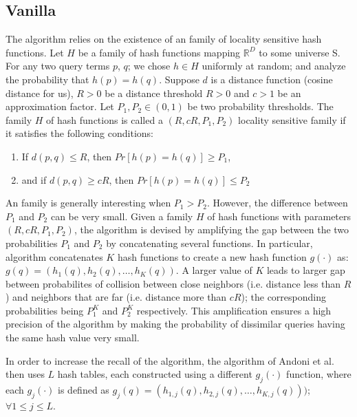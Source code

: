 \subsection{Vanilla \lsh}
\label{sec:vlsh}
The \lsh algorithm relies on the existence of an family of locality sensitive hash functions. 
Let $H$ be a family of hash functions mapping 
 $\mathbb{R}^D$ to some universe S. For any two query terms $p$, $q$; we chose $h\in H$ uniformly at random; 
 and analyze the probability that $h(p) = h(q)$.  
 Suppose $d$ is a distance function (cosine distance for us), 
$R > 0$ be a distance threshold $R>0$ and $c>1$ be an approximation factor.   
Let $P_1, P_2 \in (0, 1)$ be two probability thresholds.  
The family $H$ of hash functions is called a $(R, cR, P_1, P_2)$ locality sensitive family if 
 it satisfies the following conditions:
\begin{enumerate}
\item If $d(p,q) \leq R$, then $Pr[h(p)=h(q)] \geq P_1$, 
\item and if $d(p,q) \geq cR$, then $Pr[h(p)=h(q)] \leq P_2$
\end{enumerate}
An \lsh family is generally interesting when  $P_1>P_2$. 
However, the difference between $P_1$ and $P_2$ can be very small. 
Given a family $H$ of hash functions with parameters $(R, cR, P_1,P_2)$, 
the \lsh algorithm is devised by amplifying the gap between 
the two probabilities $P_1$ and $P_2$ by concatenating several functions. 
In particular, \lsh algorithm concatenates $K$ hash functions
to create a new hash function $g(\cdot)$ as:
$g(q)=(h_1(q),h_2(q),\dots,h_K(q))$. 
A larger value of $K$ leads to larger 
gap between probabilites of collision between close neighbors (i.e. distance less than $R$) and neighbors that are far (i.e. 
distance more than $cR$); 
the corresponding probabilities being $P_1^{K}$ and $P_2^{K}$ respectively. 
This amplification ensures a high precision of the algorithm by  
making the probability of dissimilar queries having the same hash value very small.

In order to increase the recall of the \lsh algorithm, the algorithm of Andoni et al. then uses
$L$ hash tables, each constructed using a different $g_j(\cdot)$ function, where each 
$g_j(\cdot)$ is defined as $g_j(q)=(h_{1,j}(q),h_{2,j}(q),\dots,h_{K,j}(q)))$; $\forall 1 \leq j \leq  L$. 



